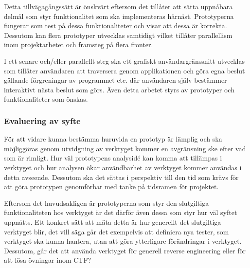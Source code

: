 Detta tillvägagångssätt är önskvärt eftersom det tillåter att sätta uppnåbara delmål som styr
funktionalitet som ska implementeras härnäst. Prototyperna fungerar som test på dessa
funktionaliteter och visar att dessa är korrekta. Dessutom kan flera prototyper 
utvecklas samtidigt vilket tillåter parallellism inom projektarbetet och
framsteg på flera fronter.

I ett senare och/eller parallellt steg ska ett grafiskt användargränssnitt
utvecklas som tillåter användaren att traversera genom applikationen och göra
egna beslut gällande förgreningar av programmet etc. där användaren själv
bestämmer interaktivt nästa beslut som görs. Även detta arbetet styrs av
prototyper och funktionaliteter som önskas.

\subsubsection{Evaluering av syfte}

För att vidare kunna bestämma huruvida en prototyp är lämplig och ska möjliggöras
genom utvidgning av verktyget kommer en avgränsning ske efter vad som är
rimligt.
Hur väl prototypens analysidé kan komma att tillämpas i verktyget och hur analysen
ökar användbarhet av verktyget kommer användas i detta avseende. Dessutom ska det sättas i perspektiv till den tid
som krävs för att göra prototypen genomförbar med tanke på tidsramen för projektet.

Eftersom det huvudsakligen är prototyperna som styr den slutgiltiga
funktionaliteten hos verktyget är det därför även dessa som styr hur väl syftet
uppnåtts. Ett konkret sätt att mäta detta är hur generellt det slutgiltiga
verktyget blir, det vill säga går det exempelvis att definiera nya tester, som verktyget
ska kunna hantera, utan att göra ytterligare förändringar i verktyget. Dessutom,
går det att använda verktyget för generell reverse engineering eller för att lösa övningar
inom CTF?




%
